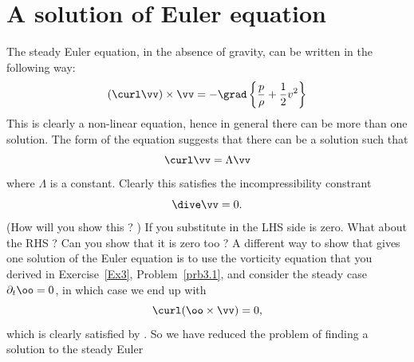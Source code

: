 \section{A solution of Euler equation}
The steady Euler equation, in the absence of gravity, can be written in the following way:
\begin{equation}
(\curl\vv)\times\vv = -\grad\left\{\frac{p}{\rho} + \frac{1}{2}
v^2\right\}
\label{A2.2:SteadyEuler}
\end{equation}
This is clearly a non-linear equation, hence in general there can be
more than one solution. The form of the equation suggests that there
can be a solution such that 
\begin{equation}
\curl \vv = \Lambda \vv
\label{A2.2:EigenCurl}
\end{equation}
where $\Lambda$ is a constant. Clearly this satisfies the
incompressibility  constrant 
\begin{equation}
\dive \vv = 0 \/.
\end{equation}
(How will you show this ? ) If you substitute  in
 the LHS side is zero. What about the RHS ? 
Can you show that it is zero too ? A different way to show that
 gives one solution of the Euler equation is to use
the vorticity equation that you derived in Exercise~\ref{Ex3}, Problem~\ref{prb3.1},
and consider the steady case $\partial_t \oo = 0$, in which case
we end up with
\begin{equation}
\curl(\oo\times\vv) = 0 \/,
\nonumber
\end{equation}
which is clearly satisfied by .  So 
we have reduced the problem of finding a solution to the steady Euler
